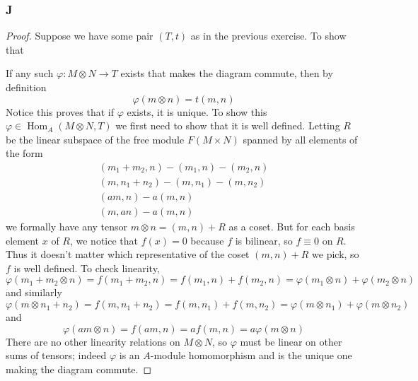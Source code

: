 \documentclass{article}
\DeclareMathOperator{\Hom}{Hom}
\begin{document}
\subsubsection{J}\label{1.3.J}
\begin{proof}
    Suppose we have some pair $(T,t)$ as in the previous exercise. To show that
    \begin{center}
    \end{center}
    If any such $\varphi:M\otimes N\to T$ exists that makes the diagram commute, then by definition
    \[
    \varphi(m\otimes n)=t(m,n)
    \]
    Notice this proves that if $\varphi$ exists, it is unique. To show this $\varphi\in \Hom_A(M\otimes N,T)$ we first need to show that it is well defined. Letting $R$ be the linear subspace of the free module $F(M\times N)$ spanned by all elements of the form
    \begin{align*}
        (m_1+m_2,n)-(m_1,n)-(m_2,n)\\
        (m,n_1+n_2)-(m,n_1)-(m,n_2)\\
        (am,n)-a(m,n)\\
        (m,an)-a(m,n)
    \end{align*}
    we formally have any tensor $m\otimes n=(m,n)+R$ as a coset. But for each basis element $x$ of $R$, we notice that $f(x)=0$ because $f$ is bilinear, so $f\equiv 0$ on $R$. Thus it doesn't matter which representative of the coset $(m,n)+R$ we pick, so $f$ is well defined. 
    To check linearity,
    \[
    \varphi(m_1+m_2\otimes n)=f(m_1+m_2,n)=f(m_1,n)+f(m_2,n)=\varphi(m_1\otimes n)+\varphi(m_2\otimes n)
    \]
    and similarly
    \[
    \varphi(m\otimes n_1+n_2)=f(m,n_1+n_2)=f(m,n_1)+f(m,n_2)=\varphi(m\otimes n_1)+\varphi(m\otimes n_2)
    \]
    and
    \[
    \varphi(am\otimes n)=f(am,n)=af(m,n)=a\varphi(m\otimes n)
    \]
    There are no other linearity relations on $M\otimes N$, so $\varphi$ must be linear on other sums of tensors; indeed $\varphi$ is an $A$-module homomorphism and is the unique one making the diagram commute.
\end{proof}
\end{document}

